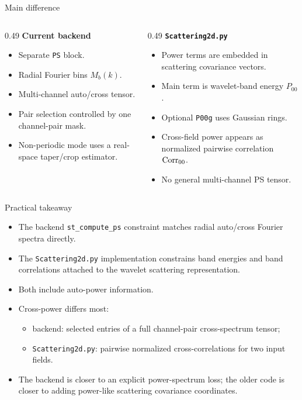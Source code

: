 \documentclass[10pt]{beamer}
\begin{document}
\begin{frame}{Main difference}
  \begin{columns}[T,onlytextwidth]
    \begin{column}{0.49\textwidth}
      \textbf{Current backend}
      \begin{itemize}
        \item Separate \texttt{PS} block.
        \item Radial Fourier bins \(M_b(k)\).
        \item Multi-channel auto/cross tensor.
        \item Pair selection controlled by one channel-pair mask.
        \item Non-periodic mode uses a real-space taper/crop estimator.
      \end{itemize}
    \end{column}
    \begin{column}{0.49\textwidth}
      \textbf{\texttt{Scattering2d.py}}
      \begin{itemize}
        \item Power terms are embedded in scattering covariance vectors.
        \item Main term is wavelet-band energy \(P_{00}\).
        \item Optional \texttt{P00g} uses Gaussian rings.
        \item Cross-field power appears as normalized pairwise correlation
        \({\rm Corr}_{00}\).
        \item No general multi-channel PS tensor.
      \end{itemize}
    \end{column}
  \end{columns}
\end{frame}

\begin{frame}{Practical takeaway}
  \begin{itemize}
    \item The backend \texttt{st\_compute\_ps} constraint matches radial
    auto/cross Fourier spectra directly.

    \item The \texttt{Scattering2d.py} implementation constrains band energies
    and band correlations attached to the wavelet scattering representation.

    \item Both include auto-power information.

    \item Cross-power differs most:
    \begin{itemize}
      \item backend: selected entries of a full channel-pair cross-spectrum
      tensor;
      \item \texttt{Scattering2d.py}: pairwise normalized cross-correlations
      for two input fields.
    \end{itemize}

    \item The backend is closer to an explicit power-spectrum loss; the older
    code is closer to adding power-like scattering covariance coordinates.
  \end{itemize}
\end{frame}
\end{document}
